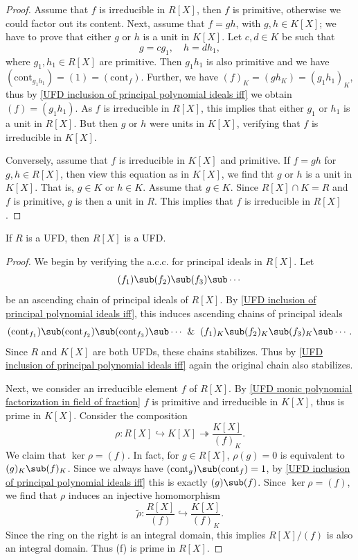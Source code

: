 \begin{proof}
Assume that $f$ is irreducible in $R[X]$, then $f$ is primitive, otherwise we could factor out its content. Next, assume that $f=gh$, with $g,h\in K[X]$; we have to prove that either $g$ or $h$ is a unit in $K[X]$. Let $c,d\in K$ be such that
\[g=cg_1,\quad h=dh_1,\]
where $g_1,h_1\in R[X]$ are primitive. Then $g_1h_1$ is also primitive and we have $(\mathrm{cont}_{g_1h_1})=(1)=(\mathrm{cont}_f)$. Further, we have $(f)_K=(gh_K)=(g_1h_1)_K$, thus by \cref{UFD inclusion of principal polynomial ideals iff} we obtain $(f)=(g_1h_1)$. As $f$ is irreducible in $R[X]$, this implies that either $g_1$ or $h_1$ is a unit in $R[X]$. But then $g$ or $h$ were units in $K[X]$, verifying that $f$ is irreducible in $K[X]$.\par
Conversely, assume that $f$ is irreducible in $K[X]$ and primitive. If $f=gh$ for $g,h\in R[X]$, then view this equation as in $K[X]$, we find tht $g$ or $h$ is a unit in $K[X]$. That is, $g\in K$ or $h\in K$. Assume that $g\in K$. Since $R[X]\cap K=R$ and $f$ is primitive, $g$ is then a unit in $R$. This implies that $f$ is irreducible in $R[X]$.
\end{proof}
\begin{theorem}
If $R$ is a UFD, then $R[X]$ is a UFD.
\end{theorem}
\begin{proof}
We begin by verifying the a.c.c. for principal ideals in $R[X]$. Let
\[(f_1)\sub(f_2)\sub(f_3)\sub\cdots\]
be an ascending chain of principal ideals of $R[X]$. By \cref{UFD inclusion of principal polynomial ideals iff}, this induces ascending chains of principal ideals
\[(\mathrm{cont}_{f_1})\sub(\mathrm{cont}_{f_2})\sub(\mathrm{cont}_{f_3})\sub\cdots\And (f_1)_K\sub(f_2)_K\sub(f_3)_K\sub\cdots.\]
Since $R$ and $K[X]$ are both UFDs, these chains stabilizes. Thus by \cref{UFD inclusion of principal polynomial ideals iff} again the original chain also stabilizes.\par
Next, we consider an irreducible element $f$ of $R[X]$. By \cref{UFD monic polynomial factorization in field of fraction} $f$ is primitive and irreducible in $K[X]$, thus is prime in $K[X]$. Consider the composition
\[\rho:R[X]\hookrightarrow K[X]\twoheadrightarrow\frac{K[X]}{(f)_K}.\]
We claim that $\ker\rho=(f)$. In fact, for $g\in R[X]$, $\rho(g)=0$ is equivalent to $(g)_K\sub(f)_K$. Since we always have $(\mathrm{cont}_g)\sub(\mathrm{cont}_f)=1$, by \cref{UFD inclusion of principal polynomial ideals iff} this is exactly $(g)\sub(f)$. Since $\ker\rho=(f)$, we find that $\rho$ induces an injective homomorphism
\[\tilde{\rho}:\frac{R[X]}{(f)}\hookrightarrow\frac{K[X]}{(f)_K}.\]
Since the ring on the right is an integral domain, this implies $R[X]/(f)$ is also an integral domain. Thus (f) is prime in $R[X]$.
\end{proof}
